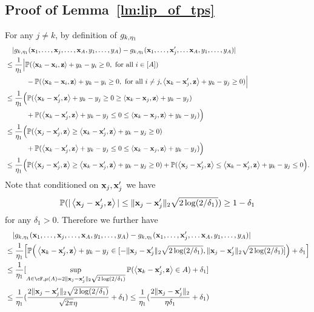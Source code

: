\subsection{Proof of Lemma~\ref{lm:lip_of_tps}}\label{sec:pf_lm:lip_of_tps}

For any $j\neq k$, by definition of $g_{k,{\eta_1}}$
\begin{align*}
     &\quad|g_{k,{\eta_1}}({\mathbf x}_1,\ldots,{\mathbf x}_j,\ldots,{\mathbf x}_A,y_1,\ldots,y_A)-g_{k,{\eta_1}}({\mathbf x}_1,\ldots,{\mathbf x}'_j,\ldots{\mathbf x}_A,y_1,\ldots,y_A)|
        \\
     &\leq
     \frac{1}{{\eta_1}}\Big|\mathbb{P}(\left\langle{\mathbf x}_k-{\mathbf x}_i,{\mathbf z}\right\rangle+y_k-y_i\geq0,\text{~for all~}i\in[A])\\
     &\qquad~~~ -\mathbb{P}(\left\langle{\mathbf x}_k-{\mathbf x}_i,{\mathbf z}\right\rangle+y_k-y_i\geq0,\text{~for all~}i\neq j, \left\langle{\mathbf x}_k-{\mathbf x}_j',{\mathbf z}\right\rangle+y_k-y_j\geq0)\Big|
     \\
      &\leq
     \frac{1}{{\eta_1}}\Big(\mathbb{P}( \left\langle{\mathbf x}_k-{\mathbf x}_j',{\mathbf z}\right\rangle+y_k-y_j\geq0\geq\left\langle{\mathbf x}_k-{\mathbf x}_j,{\mathbf z}\right\rangle+y_k-y_j )\\
     &\qquad~~~
     +\mathbb{P}( \left\langle{\mathbf x}_k-{\mathbf x}_j',{\mathbf z}\right\rangle+y_k-y_j\leq0\leq\left\langle{\mathbf x}_k-{\mathbf x}_j,{\mathbf z}\right\rangle+y_k-y_j)\Big)\\
     &\leq 
      \frac{1}{{\eta_1}}\Big(\mathbb{P}(\left\langle{\mathbf x}_j-{\mathbf x}_j',{\mathbf z}\right\rangle\geq\left\langle{\mathbf x}_k-{\mathbf x}_j',{\mathbf z}\right\rangle+y_k-y_j\geq0 )\\&\qquad~~~+\mathbb{P}( \left\langle{\mathbf x}_k-{\mathbf x}_j',{\mathbf z}\right\rangle+y_k-y_j\leq0\leq\left\langle{\mathbf x}_k-{\mathbf x}_j,{\mathbf z}\right\rangle+y_k-y_j)\Big)\\
       &\leq 
      \frac{1}{{\eta_1}}\Big(\mathbb{P}(\left\langle{\mathbf x}_j-{\mathbf x}_j',{\mathbf z}\right\rangle\geq\left\langle{\mathbf x}_k-{\mathbf x}_j',{\mathbf z}\right\rangle+y_k-y_j\geq0 )+\mathbb{P}(\left\langle{\mathbf x}_j-{\mathbf x}_j',{\mathbf z}\right\rangle\leq \left\langle{\mathbf x}_k-{\mathbf x}_j',{\mathbf z}\right\rangle+y_k-y_j\leq0\Big).   
\end{align*}
Note that conditioned on ${\mathbf x}_j,{\mathbf x}_j'$ we have
\begin{align*}
    \mathbb{P}(|\left\langle{\mathbf x}_j-{\mathbf x}_j',{\mathbf z}\right\rangle|\leq \|{\mathbf x}_j-{\mathbf x}_j'\|_2\sqrt{2\log(2/{\delta_1})})\geq 1-{\delta_1}
\end{align*} for any ${\delta_1}>0$. Therefore we further have
\begin{align*}
    &\quad|g_{k,\trunprob}(\bx_1,\ldots,\bx_j,\ldots,\bx_A,y_1,\ldots,y_A)-g_{k,\trunprob}(\bx_1,\ldots,\bx'_j,\ldots\bx_A,y_1,\ldots,y_A)|
    \\
    &\leq
     \frac{1}{\trunprob}\Big[\P\Big(\<\bx_k-\bx_j',\bz\>+y_k-y_j\in[-\|\bx_j-\bx_j'\|_2\sqrt{2\log(2/{\delta_1})},\|\bx_j-\bx_j'\|_2\sqrt{2\log(2/{\delta_1})}] \Big)+{\delta_1}\Big]\\
     &\leq 
    \frac{1}{\trunprob}[\sup_{A\in\cF,\mu(A)=2\|\bx_j-\bx_j'\|_2\sqrt{2\log(2/{\delta_1})}}\P(\<\bx_k-\bx_j',\bz\>\in A)+{\delta_1}]\\
    &\leq 
   \frac{1}{\trunprob}(\frac{2\|\bx_j-\bx_j'\|_2\sqrt{2\log(2/{\delta_1})}}{\sqrt{2\pi}\Trunregp}+{\delta_1})\leq \frac{1}{\trunprob}(\frac{2\|\bx_j-\bx_j'\|_2}{\Trunregp{\delta_1}}+{\delta_1})
\end{align*}
